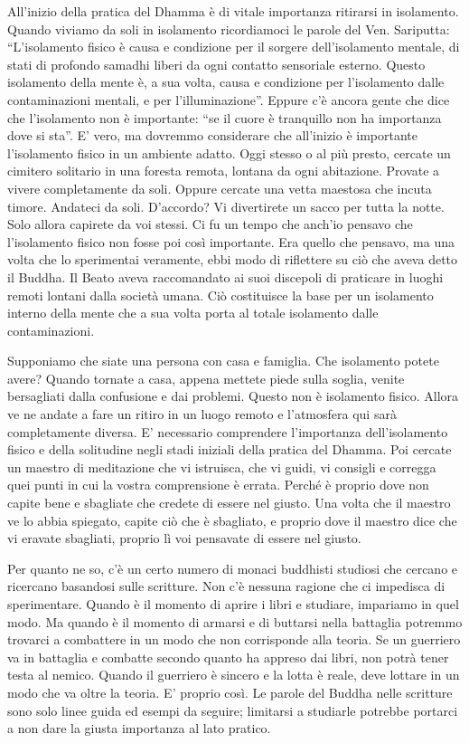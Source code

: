 All'inizio della pratica del Dhamma è di vitale importanza ritirarsi in
isolamento. Quando viviamo da soli in isolamento ricordiamoci le parole
del Ven. Sariputta: ``L'isolamento fisico è causa e condizione per il
sorgere dell'isolamento mentale, di stati di profondo samadhi liberi da
ogni contatto sensoriale esterno. Questo isolamento della mente è, a sua
volta, causa e condizione per l'isolamento dalle contaminazioni mentali,
e per l'illuminazione''. Eppure c'è ancora gente che dice che
l'isolamento non è importante: ``se il cuore è tranquillo non ha
importanza dove si sta''. E' vero, ma dovremmo considerare che
all'inizio è importante l'isolamento fisico in un ambiente adatto. Oggi
stesso o al più presto, cercate un cimitero solitario in una foresta
remota, lontana da ogni abitazione. Provate a vivere completamente da
soli. Oppure cercate una vetta maestosa che incuta timore. Andateci da
soli. D'accordo? Vi divertirete un sacco per tutta la notte. Solo allora
capirete da voi stessi. Ci fu un tempo che anch'io pensavo che
l'isolamento fisico non fosse poi così importante. Era quello che
pensavo, ma una volta che lo sperimentai veramente, ebbi modo di
riflettere su ciò che aveva detto il Buddha. Il Beato aveva raccomandato
ai suoi discepoli di praticare in luoghi remoti lontani dalla società
umana. Ciò costituisce la base per un isolamento interno della mente che
a sua volta porta al totale isolamento dalle contaminazioni.

Supponiamo che siate una persona con casa e famiglia. Che isolamento
potete avere? Quando tornate a casa, appena mettete piede sulla soglia,
venite bersagliati dalla confusione e dai problemi. Questo non è
isolamento fisico. Allora ve ne andate a fare un ritiro in un luogo
remoto e l'atmosfera qui sarà completamente diversa. E' necessario
comprendere l'importanza dell'isolamento fisico e della solitudine negli
stadi iniziali della pratica del Dhamma. Poi cercate un maestro di
meditazione che vi istruisca, che vi guidi, vi consigli e corregga quei
punti in cui la vostra comprensione è errata. Perché è proprio dove non
capite bene e sbagliate che credete di essere nel giusto. Una volta che
il maestro ve lo abbia spiegato, capite ciò che è sbagliato, e proprio
dove il maestro dice che vi eravate sbagliati, proprio lì voi pensavate
di essere nel giusto.

Per quanto ne so, c'è un certo numero di monaci buddhisti studiosi che
cercano e ricercano basandosi sulle scritture. Non c'è nessuna ragione
che ci impedisca di sperimentare. Quando è il momento di aprire i libri
e studiare, impariamo in quel modo. Ma quando è il momento di armarsi e
di buttarsi nella battaglia potremmo trovarci a combattere in un modo
che non corrisponde alla teoria. Se un guerriero va in battaglia e
combatte secondo quanto ha appreso dai libri, non potrà tener testa al
nemico. Quando il guerriero è sincero e la lotta è reale, deve lottare
in un modo che va oltre la teoria. E' proprio così. Le parole del Buddha
nelle scritture sono solo linee guida ed esempi da seguire; limitarsi a
studiarle potrebbe portarci a non dare la giusta importanza al lato
pratico.

